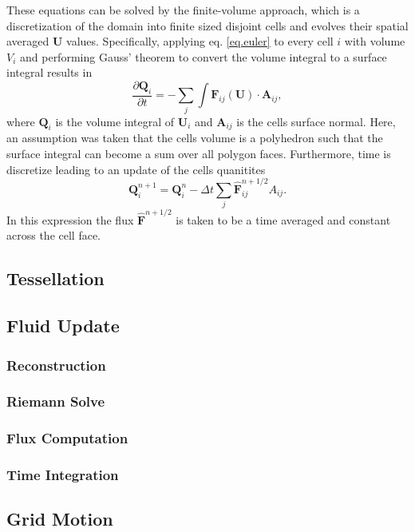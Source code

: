 These equations can be solved by the finite-volume approach, which is a discretization
of the domain into finite sized disjoint cells and evolves their spatial averaged
$\mathbf{U}$ values. Specifically, applying eq. \ref{eq.euler} to every cell $i$ with
volume $V_i$ and performing Gauss' theorem to convert the volume integral to a
surface integral results in
%
\begin{equation}
    \label{eq.euler_int}
    \frac{\partial{\mathbf{Q}}_i}{\partial{t}} =
    -\sum_{j}\int\mathbf{F}_{ij}(\mathbf{U})\cdot\mathbf{A}_{ij},
\end{equation}
%
where $\mathbf{Q}_i$ is the volume integral of $\mathbf{U}_i$ and $\mathbf{A}_{ij}$ is the
cells surface normal. Here, an assumption was taken that the cells volume is a polyhedron
such that the surface integral can become a sum over all polygon faces. Furthermore, time
is discretize leading to an update of the cells quanitites
%
\begin{equation}
    \mathbf{Q}_i^{n+1} = \mathbf{Q}_i^n - \Delta t\sum_j \mathbf{\hat{F}}_{ij}^{n+1/2} A_{ij}.
\end{equation}
%
In this expression the flux $\mathbf{\hat{F}}^{n+1/2}$ is taken to be a time averaged and
constant across the cell face.

\subsection{Tessellation}

\subsection{Fluid Update}
\subsubsection{Reconstruction}
\subsubsection{Riemann Solve}
\subsubsection{Flux Computation}
\subsubsection{Time Integration}

\subsection{Grid Motion}

